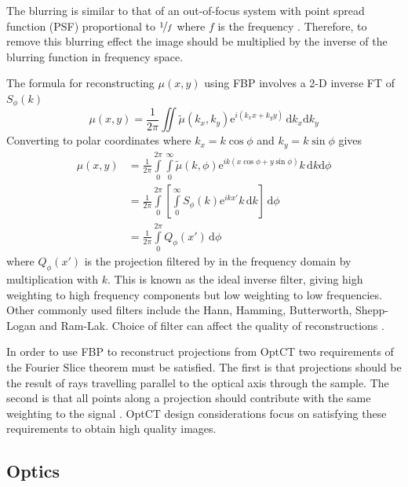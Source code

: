 The blurring is similar to that of an out-of-focus system with point spread function (PSF) proportional to $\nicefrac{1}{f}$ where $f$ is the frequency \cite{russ2002image}. Therefore, to remove this blurring effect the image should be multiplied by the inverse of the blurring function in frequency space.

The formula for reconstructing $\mu(x,y)$ using FBP involves a 2-D inverse FT of $S_{\phi}(k)$
\begin{equation}
\mu(x,y) = \frac{1}{2\pi} \iint \tilde{\mu}(k_x,k_y) \mathrm{e}^{i\left(k_xx+k_yy\right)}\, \mathrm{d}k_x\mathrm{d}k_y
\end{equation}
Converting to polar coordinates where $k_x=k\cos\phi$ and $k_y=k\sin\phi$ gives
\begin{align}
\mu(x,y) &= \frac{1}{2\pi} \int\limits_0^{2\pi} \int\limits_0^{\infty} \tilde{\mu}(k,\phi) \mathrm{e}^{ik\left(x\cos\phi+y\sin\phi\right)}k\, \mathrm{d}k\mathrm{d}\phi \\
&= \frac{1}{2\pi} \int\limits_0^{2\pi}\left[\int\limits_0^{\infty}S_{\phi}(k)\mathrm{e}^{ikx'}k\, \mathrm{d}k \right]\, \mathrm{d}\phi \\
&= \frac{1}{2\pi} \int\limits_0^{2\pi}Q_{\phi}(x')\, \mathrm{d}\phi
\end{align}
where $Q_{\phi}(x')$ is the projection filtered by in the frequency domain by multiplication with $k$. This is known as the ideal inverse filter, giving high weighting to high frequency components but low weighting to low frequencies. Other commonly used filters include the Hann,  Hamming, Butterworth, Shepp-Logan and Ram-Lak. Choice of filter can affect the quality of reconstructions \cite{russ2002image}.

In order to use  FBP to reconstruct projections from OptCT two requirements of the Fourier Slice theorem must be satisfied. The first is that projections should be the result of rays travelling parallel to the optical axis through the sample. The second is that all points along a projection should contribute with the same weighting to the signal \cite{Wang:2007}. OptCT design considerations focus on satisfying these requirements to obtain high quality images.






\subsection{Optics}

